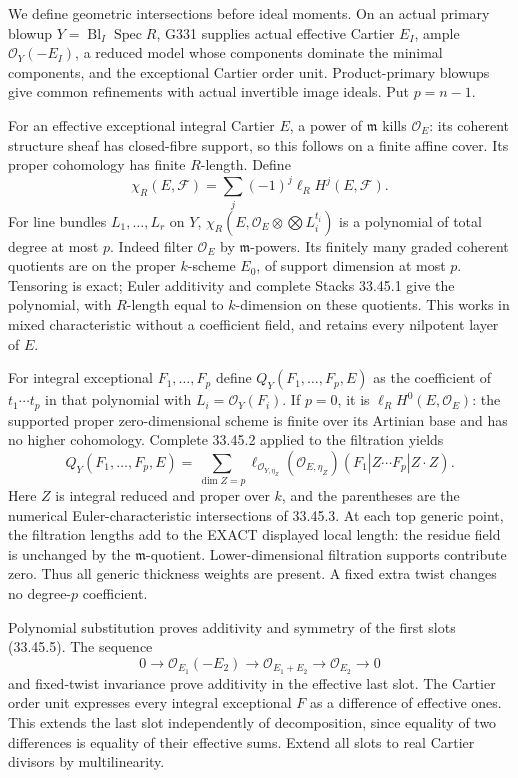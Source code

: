 We define geometric intersections before ideal moments. On an actual primary blowup \(Y=\operatorname{Bl}_I\operatorname{Spec}R\), G331 supplies actual effective Cartier \(E_I\), ample \(\mathcal O_Y(-E_I)\), a reduced model whose components dominate the minimal components, and the exceptional Cartier order unit. Product-primary blowups give common refinements with actual invertible image ideals. Put \(p=n-1\).

For an effective exceptional integral Cartier \(E\), a power of \(\mathfrak m\) kills \(\mathcal O_E\): its coherent structure sheaf has closed-fibre support, so this follows on a finite affine cover. Its proper cohomology has finite \(R\)-length. Define
\[
\chi_R(E,\mathcal F)=\sum_j(-1)^j\ell_R H^j(E,\mathcal F).
\]
For line bundles \(L_1,\ldots,L_r\) on \(Y\), \(\chi_R(E,\mathcal O_E\otimes\bigotimes L_i^{t_i})\) is a polynomial of total degree at most \(p\). Indeed filter \(\mathcal O_E\) by \(\mathfrak m\)-powers. Its finitely many graded coherent quotients are on the proper \(k\)-scheme \(E_0\), of support dimension at most \(p\). Tensoring is exact; Euler additivity and complete Stacks 33.45.1 give the polynomial, with \(R\)-length equal to \(k\)-dimension on these quotients. This works in mixed characteristic without a coefficient field, and retains every nilpotent layer of \(E\).

For integral exceptional \(F_1,\ldots,F_p\) define \(Q_Y(F_1,\ldots,F_p,E)\) as the coefficient of \(t_1\cdots t_p\) in that polynomial with \(L_i=\mathcal O_Y(F_i)\). If \(p=0\), it is \(\ell_R H^0(E,\mathcal O_E)\): the supported proper zero-dimensional scheme is finite over its Artinian base and has no higher cohomology. Complete 33.45.2 applied to the filtration yields
\[
Q_Y(F_1,\ldots,F_p,E)
=\sum_{\dim Z=p}\ell_{\mathcal O_{Y,\eta_Z}}(\mathcal O_{E,\eta_Z})
 (F_1|Z\cdots F_p|Z\cdot Z). \tag{C}
\]
Here \(Z\) is integral reduced and proper over \(k\), and the parentheses are the numerical Euler-characteristic intersections of 33.45.3. At each top generic point, the filtration lengths add to the EXACT displayed local length: the residue field is unchanged by the \(\mathfrak m\)-quotient. Lower-dimensional filtration supports contribute zero. Thus all generic thickness weights are present. A fixed extra twist changes no degree-\(p\) coefficient.

Polynomial substitution proves additivity and symmetry of the first slots (33.45.5). The sequence
\[
0\longrightarrow\mathcal O_{E_1}(-E_2)
\longrightarrow\mathcal O_{E_1+E_2}
\longrightarrow\mathcal O_{E_2}\longrightarrow0
\]
and fixed-twist invariance prove additivity in the effective last slot. The Cartier order unit expresses every integral exceptional \(F\) as a difference of effective ones. This extends the last slot independently of decomposition, since equality of two differences is equality of their effective sums. Extend all slots to real Cartier divisors by multilinearity.

